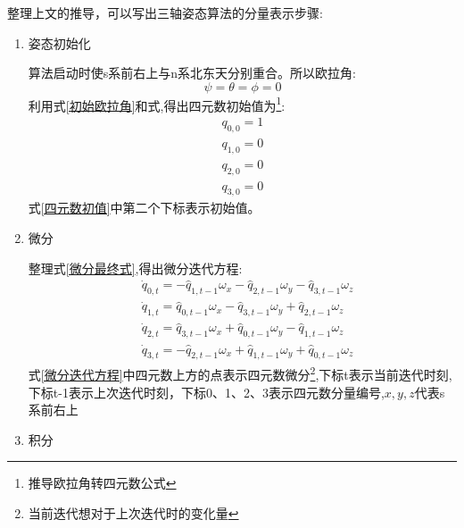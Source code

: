 整理上文的推导，可以写出三轴姿态算法的分量表示步骤:
\begin{enumerate}
    \item 姿态初始化

        算法启动时使s系前右上与n系北东天分别重合。所以欧拉角:
        \begin{equation}\label{初始欧拉角}
            \psi = \theta = \phi = 0
        \end{equation}
        利用式\ref{初始欧拉角}和式,得出四元数初始值为\footnote{推导欧拉角转四元数公式}:
        \begin{equation}\label{四元数初值}
            \begin{aligned} 
                q_{0,0} = 1 \\
                q_{1,0} = 0 \\
                q_{2,0} = 0 \\
                q_{3,0} = 0
            \end{aligned}
        \end{equation}
        式\ref{四元数初值}中第二个下标表示初始值。
    \item 微分

        整理式\ref{微分最终式},得出微分迭代方程:
        \begin{equation} \label{微分迭代方程}
            \begin{aligned} 
                &\dot{q}_{0,t} = -\hat{q}_{1,t-1} \omega_x - \hat{q}_{2,t-1} \omega_y - \hat{q}_{3,t-1} \omega_z \\
                &\dot{q}_{1,t} =  \hat{q}_{0,t-1} \omega_x - \hat{q}_{3,t-1} \omega_y + \hat{q}_{2,t-1} \omega_z \\
                &\dot{q}_{2,t} =  \hat{q}_{3,t-1} \omega_x + \hat{q}_{0,t-1} \omega_y - \hat{q}_{1,t-1} \omega_z \\
                &\dot{q}_{3,t} = -\hat{q}_{2,t-1} \omega_x + \hat{q}_{1,t-1} \omega_y + \hat{q}_{0,t-1} \omega_z
            \end{aligned}
        \end{equation} 
        式\ref{微分迭代方程}中四元数上方的点表示四元数微分\footnote{当前迭代想对于上次迭代时的变化量},下标t表示当前迭代时刻,下标t-1表示上次迭代时刻，下标0、1、2、3表示四元数分量编号,$x,y,z$代表s系前右上
    \item 积分


\end{enumerate}
